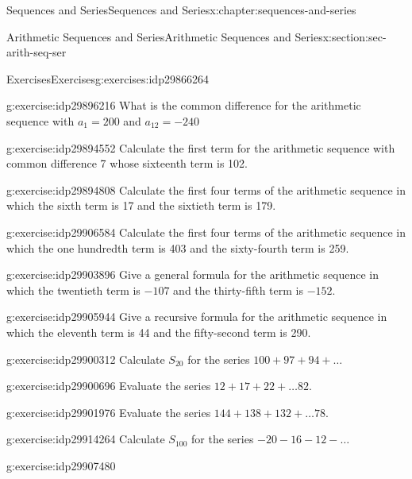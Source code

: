 \documentclass[twoside,10pt,]{book}
\numberwithin{equation}{section}
\begin{document}
\begin{chapterptx}{Sequences and Series}{}{Sequences and Series}{}{}{x:chapter:sequences-and-series}
\begin{sectionptx}{Arithmetic Sequences and Series}{}{Arithmetic Sequences and Series}{}{}{x:section:sec-arith-seq-ser}
\begin{exercises-subsection}{Exercises}{}{Exercises}{}{}{g:exercises:idp29866264}
\begin{divisionexercise}{21}{}{}{g:exercise:idp29896216}%
What is the common difference for the arithmetic sequence with \(a_1 = 200\) and \(a_{12} =  - 240\)\end{divisionexercise}%
\begin{divisionexercise}{22}{}{}{g:exercise:idp29894552}%
Calculate the first term for the arithmetic sequence with common difference 7 whose sixteenth term is 102.\end{divisionexercise}%
\begin{divisionexercise}{23}{}{}{g:exercise:idp29894808}%
Calculate the first four terms of the arithmetic sequence in which the sixth term is 17 and the sixtieth term is 179.\end{divisionexercise}%
\begin{divisionexercise}{24}{}{}{g:exercise:idp29906584}%
Calculate the first four terms of the arithmetic sequence in which the one hundredth term is 403 and the sixty-fourth term is 259.\end{divisionexercise}%
\begin{divisionexercise}{25}{}{}{g:exercise:idp29903896}%
Give a general formula for the arithmetic sequence in which the twentieth term is \(-107\) and the thirty-fifth term is \(-152\).\end{divisionexercise}%
\begin{divisionexercise}{26}{}{}{g:exercise:idp29905944}%
Give a recursive formula for the arithmetic sequence in which the eleventh term is 44 and the fifty-second term is 290.\end{divisionexercise}%
\begin{divisionexercise}{27}{}{}{g:exercise:idp29900312}%
Calculate \(S_{20}\) for the series \(100 + 97 + 94 + \ldots\)\end{divisionexercise}%
\begin{divisionexercise}{28}{}{}{g:exercise:idp29900696}%
Evaluate the series \(12 + 17 + 22 + \ldots 82\).\end{divisionexercise}%
\begin{divisionexercise}{29}{}{}{g:exercise:idp29901976}%
Evaluate the series \(144 + 138 + 132 + \ldots 78\).\end{divisionexercise}%
\begin{divisionexercise}{30}{}{}{g:exercise:idp29914264}%
Calculate \(S_{100}\) for the series \(-20  - 16  - 12 - \ldots\)\end{divisionexercise}%
\begin{divisionexercise}{31}{}{}{g:exercise:idp29907480}%

\end{divisionexercise}
\end{exercises-subsection}
\end{sectionptx}
\end{chapterptx}
\end{document}
